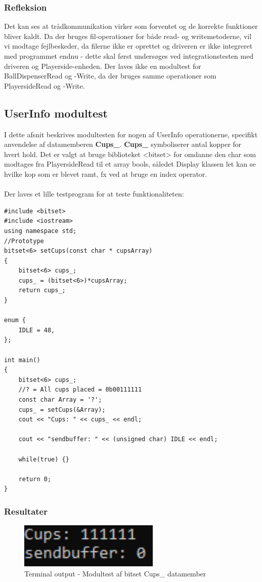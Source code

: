 \documentclass[Modultest/Modultest_main.tex]{subfiles}
\begin{document}
\subsubsection{Refleksion}
Det kan ses at trådkommunikation virker som forventet og de korrekte funktioner bliver kaldt. Da der bruges fil-operationer for både read- og writemetoderne, vil vi modtage fejlbeskeder, da filerne ikke er oprettet og driveren er ikke integreret med programmet endnu - dette skal først undersøges ved integrationstesten med driveren og Playerside-enheden. 
Der laves ikke en modultest for BallDispenserRead og -Write, da der bruges samme operationer som PlayersideRead og -Write. 
\subsection{UserInfo modultest}
I dette afsnit beskrives modultesten for nogen af UserInfo operationerne, specifikt anvendelse af datamemberen \textbf{Cups\_}. \textbf{Cups\_} symboliserer antal kopper for hvert hold. Det er valgt at bruge biblioteket <bitset> for omdanne den char som modtages fra PlayersideRead til et array bools, såledet Display klassen let kan se hvilke kop som er blevet ramt, fx ved at bruge en index operator. \\\\
Der laves et lille testprogram for at teste funktionaliteten: 
\begin{lstlisting}
#include <bitset>
#include <iostream>
using namespace std;
//Prototype
bitset<6> setCups(const char * cupsArray)
{
	bitset<6> cups_; 
	cups_ = (bitset<6>)*cupsArray; 
	return cups_; 
}

enum {
	IDLE = 48, 
};

int main()
{
	bitset<6> cups_;
	//? = All cups placed = 0b00111111
	const char Array = '?'; 
	cups_ = setCups(&Array); 
	cout << "Cups: " << cups_ << endl; 

	cout << "sendbuffer: " << (unsigned char) IDLE << endl; 
	
	while(true) {}

	return 0; 
}
\end{lstlisting}
\subsubsection{Resultater}
\begin{figure}[H]
    \centering
    \includegraphics[width=0.6\textwidth]{Modultest/GameController/graphic/Modultest_userInfo.png}
    \caption{Terminal output - Modultest af bitset Cups\_ datamember}
    \label{fig:test_cups}
\end{figure}
\end{document}
